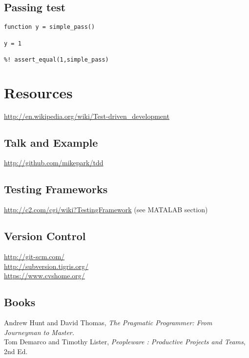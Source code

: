 \documentclass[twocolumn]{article}
\begin{document}
  \subsection{Passing test}
  \begin{verbatim}
function y = simple_pass()

y = 1

%! assert_equal(1,simple_pass)
  \end{verbatim}




  \section{Resources}

  \url{http://en.wikipedia.org/wiki/Test-driven_development}

  \subsection{Talk and Example}  
  \url{http://github.com/mikepark/tdd}

  \subsection{Testing Frameworks}  
  \url{http://c2.com/cgi/wiki?TestingFramework} (see MATALAB section)

  \subsection{Version Control}
  \url{http://git-scm.com/} \\
  \url{http://subversion.tigris.org/}\\
  \url{https://www.cvshome.org/}\

  \subsection{Books}
  Andrew Hunt and David Thomas,
  \textit{The Pragmatic Programmer: From Journeyman to Master.}\\
  Tom Demarco and Timothy Lister,
  \textit{Peopleware : Productive Projects and Teams}, 2nd Ed.
\end{document}
